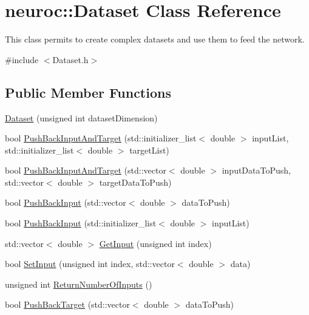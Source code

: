 \hypertarget{classneuroc_1_1_dataset}{\section{neuroc\-:\-:Dataset Class Reference}
\label{classneuroc_1_1_dataset}
}


This class permits to create complex datasets and use them to feed the network.  




{\ttfamily \#include $<$Dataset.\-h$>$}

\subsection*{Public Member Functions}
\begin{DoxyCompactItemize}
\item 
\hyperlink{classneuroc_1_1_dataset_a58c2264c9b5d1b921f0220e334663773}{Dataset} (unsigned int dataset\-Dimension)
\item 
bool \hyperlink{classneuroc_1_1_dataset_ae1bb7d512438456bc0bb868e4c03f41f}{Push\-Back\-Input\-And\-Target} (std\-::initializer\-\_\-list$<$ double $>$ input\-List, std\-::initializer\-\_\-list$<$ double $>$ target\-List)
\item 
bool \hyperlink{classneuroc_1_1_dataset_a8cf8d995f7f3140970e88c1663a6d3b6}{Push\-Back\-Input\-And\-Target} (std\-::vector$<$ double $>$ input\-Data\-To\-Push, std\-::vector$<$ double $>$ target\-Data\-To\-Push)
\item 
bool \hyperlink{classneuroc_1_1_dataset_a6dc0e96a90fcd6318985fe5914f1fa36}{Push\-Back\-Input} (std\-::vector$<$ double $>$ data\-To\-Push)
\item 
bool \hyperlink{classneuroc_1_1_dataset_abdf6b94279a7214f0c67d92563ea8a01}{Push\-Back\-Input} (std\-::initializer\-\_\-list$<$ double $>$ input\-List)
\item 
std\-::vector$<$ double $>$ \hyperlink{classneuroc_1_1_dataset_a69ded99bf2879a71ae8734a4ae7519be}{Get\-Input} (unsigned int index)
\item 
bool \hyperlink{classneuroc_1_1_dataset_a63152318ab651c1022f695780cf22a7a}{Set\-Input} (unsigned int index, std\-::vector$<$ double $>$ data)
\item 
unsigned int \hyperlink{classneuroc_1_1_dataset_ab81cbb4ca81442ade12eca43981d105b}{Return\-Number\-Of\-Inputs} ()
\item 
bool \hyperlink{classneuroc_1_1_dataset_a87614de72546b8201b953b950f623b4a}{Push\-Back\-Target} (std\-::vector$<$ double $>$ data\-To\-Push)

\end{DoxyCompactItemize}
